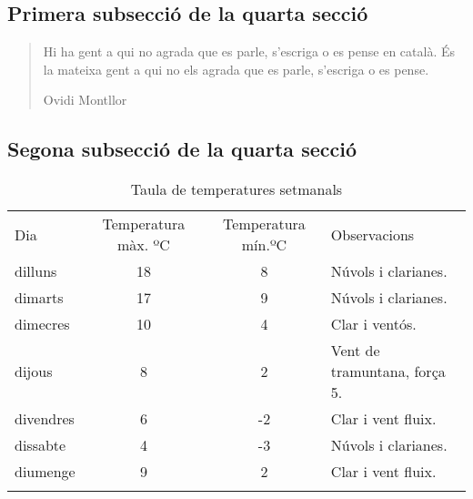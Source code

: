 \documentclass[a4paper,%
                             twoside,%
                             BCOR1.0cm,%
                             DIV11,%
                             parskip=full,%
                             11pt]{scrbook}
\let\shline\hline
\def\hline{\noalign{\vskip3pt}\shline\noalign{\vskip4pt}}
\begin{document}
\subsection{Primera subsecció de la quarta secció}\label{sbsec:primera}
\lipsum[1-3]
\begin{quote}
Hi ha gent a qui no agrada que es parle, s’escriga o es pense en català. És la mateixa gent a qui no els agrada que es parle, s’escriga o es pense.

Ovidi Montllor
\end{quote}
\subsection{Segona subsecció de la quarta secció}\label{sbsec:segona}
\lipsum[4-5]
\begin{table}[h]
\centering\scriptsize
\begin{tabular}{l|c|c|l}
\hline
Dia & Temperatura màx. ºC & Temperatura mín.ºC & Observacions \\
\hline
dilluns   & 18 & 8 & Núvols i clarianes. \\
dimarts   & 17 & 9 & Núvols i clarianes. \\
dimecres  & 10 & 4 & Clar i ventós. \\
dijous    &  8 & 2 & Vent de tramuntana, força 5. \\
divendres &  6 & -2 & Clar i vent fluix. \\
dissabte  & 4 & -3 & Núvols i clarianes. \\
diumenge  & 9 & 2 &  Clar i vent fluix. \\
\hline
\end{tabular}
\caption{Taula de temperatures setmanals}\label{tab:temp2}
\end{table}
\lipsum[8-9]
\end{document}
